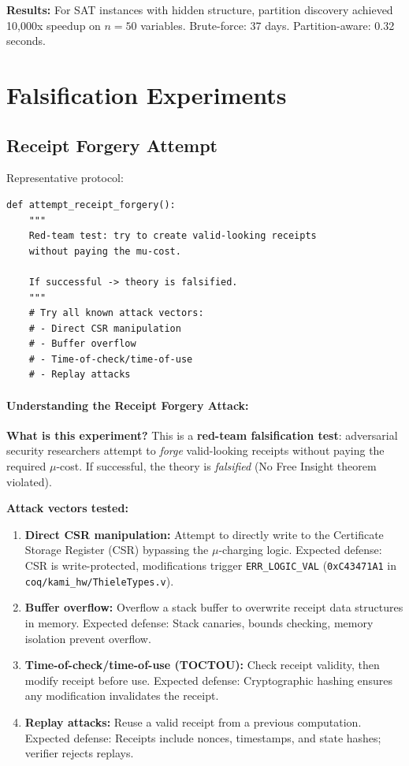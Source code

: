\textbf{Results:} For SAT instances with hidden structure, partition discovery achieved 10,000x speedup on $n = 50$ variables. Brute-force: 37 days. Partition-aware: 0.32 seconds.

\section{Falsification Experiments}


\subsection{Receipt Forgery Attempt}

Representative protocol:
\begin{lstlisting}
def attempt_receipt_forgery():
    """
    Red-team test: try to create valid-looking receipts
    without paying the mu-cost.
    
    If successful -> theory is falsified.
    """
    # Try all known attack vectors:
    # - Direct CSR manipulation
    # - Buffer overflow
    # - Time-of-check/time-of-use
    # - Replay attacks
\end{lstlisting}

\paragraph{Understanding the Receipt Forgery Attack:}

\textbf{What is this experiment?} This is a \textbf{red-team falsification test}: adversarial security researchers attempt to \textit{forge} valid-looking receipts without paying the required $\mu$-cost. If successful, the theory is \textit{falsified} (No Free Insight theorem violated).

\textbf{Attack vectors tested:}
\begin{enumerate}
    \item \textbf{Direct CSR manipulation:} Attempt to directly write to the Certificate Storage Register (CSR) bypassing the $\mu$-charging logic. Expected defense: CSR is write-protected, modifications trigger \texttt{ERR\_LOGIC\_VAL} (\texttt{0xC43471A1} in \texttt{coq/kami\_hw/ThieleTypes.v}).
    
    \item \textbf{Buffer overflow:} Overflow a stack buffer to overwrite receipt data structures in memory. Expected defense: Stack canaries, bounds checking, memory isolation prevent overflow.
    
    \item \textbf{Time-of-check/time-of-use (TOCTOU):} Check receipt validity, then modify receipt before use. Expected defense: Cryptographic hashing ensures any modification invalidates the receipt.
    
    \item \textbf{Replay attacks:} Reuse a valid receipt from a previous computation. Expected defense: Receipts include nonces, timestamps, and state hashes; verifier rejects replays.
\end{enumerate}

